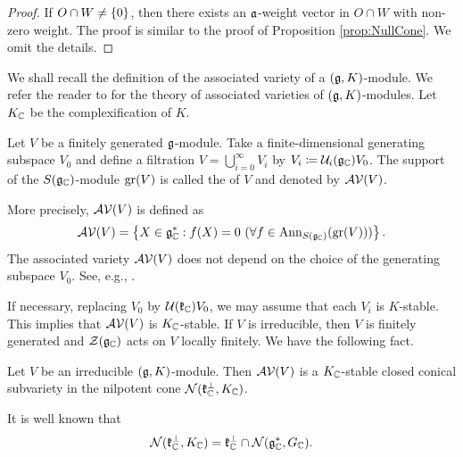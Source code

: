 \begin{proof}
	If $O \cap W \neq \left\{0 \right\}$, then there exists an $\mathfrak{a}$-weight vector in $O\cap W$ with non-zero weight.
	The proof is similar to the proof of Proposition \ref{prop:NullCone}.
	We omit the details.
\end{proof}

We shall recall the definition of the associated variety of a $(\mathfrak{g}, K)$-module.
We refer the reader to \cite{Vo89} for the theory of associated varieties of $(\mathfrak{g}, K)$-modules.
Let $K_{\mathbb{C}}$ be the complexification of $K$.

\begin{definition}
	Let $V$ be a finitely generated $\mathfrak{g}$-module.
	Take a finite-dimensional generating subspace $V_0$ and define a filtration $V = \bigcup_{i=0}^\infty V_i$ by $V_i \coloneq \mathcal{U}_{i}(\mathfrak{g}_{\mathbb{C}}) V_0$.
	The support of the $S(\mathfrak{g}_{\mathbb{C}})$-module $\operatorname{gr}(V)$ is called the  of $V$ and denoted by $\mathcal{AV}(V)$.
\end{definition}

More precisely, $\mathcal{AV}(V)$ is defined as
\begin{align*}
	\mathcal{AV}(V) = \left\{X \in \mathfrak{g}_{\mathbb{C}}^*: f(X) = 0 \ (\forall f \in \mathrm{Ann}_{S(\mathfrak{g}_{\mathbb{C}})}(\operatorname{gr}(V))) \right\}.
\end{align*}
The associated variety $\mathcal{AV}(V)$ does not depend on the choice of the generating subspace $V_0$.
See, e.g., \cite{Vo89}.

If necessary, replacing $V_0$ by $\mathcal{U}(\mathfrak{k}_{\mathbb{C}})V_0$, we may assume that each $V_i$ is $K$-stable.
This implies that $\mathcal{AV}(V)$ is $K_{\mathbb{C}}$-stable.
If $V$ is irreducible, then $V$ is finitely generated and $\mathcal{Z}(\mathfrak{g}_{\mathbb{C}})$ acts on $V$ locally finitely.
We have the following fact.

\begin{fact} \label{fact:AssociatedVariety}
	Let $V$ be an irreducible $(\mathfrak{g}, K)$-module.
	Then $\mathcal{AV}(V)$ is a $K_{\mathbb{C}}$-stable closed conical subvariety in the nilpotent cone $\mathcal{N}(\mathfrak{k}_{\mathbb{C}}^\perp, K_{\mathbb{C}})$.
\end{fact}

\begin{remark} \label{remark:AssociatedVariety}
	It is well known that
	\begin{align*}
		\mathcal{N}(\mathfrak{k}_{\mathbb{C}}^\perp, K_{\mathbb{C}}) = \mathfrak{k}_{\mathbb{C}}^\perp \cap \mathcal{N}(\mathfrak{g}_{\mathbb{C}}^*, G_{\mathbb{C}}).
	\end{align*}
\end{remark}

